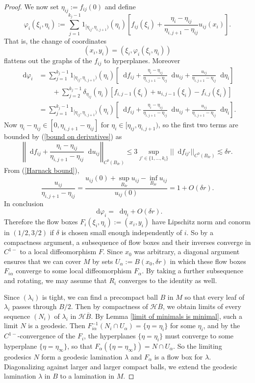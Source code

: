 \documentclass[reqno,11pt]{amsart}
\newcommand*\dif{\mathop{}\!\mathrm{d}}
\newcommand{\Hypspace}{\mathscr H}
\theoremstyle{definition}
\numberwithin{equation}{section}
\begin{document}
\begin{proof}
We now set $\eta_{ij} := f_{ij}(0)$ and define
$$\varphi_i(\xi_i, \eta_i) := \sum_{j=1}^{k_j - 1} 1_{[\eta_{ij}, \eta_{i,j+1})}(\eta_i) \left[f_{ij}(\xi_i) + \frac{\eta_i - \eta_{ij}}{\eta_{i,j+1} - \eta_{ij}} u_{ij}(x_i)\right].$$
That is, the change of coordinates
$$(x_i, y_i) = (\xi_i, \varphi_i(\xi_i, \eta_i))$$
flattens out the graphs of the $f_{ij}$ to hyperplanes.
Moreover
\begin{align*}
\dif \varphi_i &= \sum_{j=1}^{k_j - 1} 1_{[\eta_{ij}, \eta_{i, j + 1})}(\eta_i) \left[\dif f_{ij} + \frac{\eta_i - \eta_{ij}}{\eta_{i,j+1} - \eta_{ij}} \dif u_{ij} + \frac{u_{ij}}{\eta_{i,j+1} - \eta_{ij}} \dif \eta_i\right] \\
&\qquad + \sum_{j = 2}^{k_j - 1} \delta_{\eta_{ij}}(\eta_i)\left[f_{i,j-1}(\xi_i) + u_{i,j-1}(\xi_i) - f_{i,j}(\xi_i)\right] \\
&= \sum_{j=1}^{k_j - 1} 1_{[\eta_{ij}, \eta_{i, j + 1})}(\eta_i) \left[\dif f_{ij} + \frac{\eta_i - \eta_{ij}}{\eta_{i,j+1} - \eta_{ij}} \dif u_{ij} + \frac{u_{ij}}{\eta_{i,j+1} - \eta_{ij}} \dif \eta_i\right].
\end{align*}
Now $\eta_i - \eta_{ij} \in [0, \eta_{i, j + 1} - \eta_{ij}]$ for $\eta_i \in [\eta_{ij}, \eta_{i,j+1})$, so the first two terms are bounded by (\ref{bound on derivatives}) as
$$\left|\left|\dif f_{ij} + \frac{\eta_i - \eta_{ij}}{\eta_{i,j+1} - \eta_{ij}} \dif u_{ij}\right|\right|_{C^0(B_{\delta r})}
\leq 3\sup_{j' \in \{1, \dots, k_i\}} ||\dif f_{ij'}||_{C^0(B_{\delta r})}
\lesssim \delta r.$$
From (\ref{Harnack bound}),
$$\frac{u_{ij}}{\eta_{i,j+1} - \eta_{ij}} = \frac{u_{ij}(0) + \sup_{B_{\delta r}} u_{ij} - \inf_{B_{\delta r}} u_{ij}}{u_{ij}(0)} = 1 + O(\delta r).$$
In conclusion
$$\dif \varphi_i = \dif \eta_i + O(\delta r).$$
Therefore the flow boxes $F_i(\xi_i, \eta_i) := (x_i, y_i)$ have Lipschitz norm and conorm in $(1/2, 3/2)$ if $\delta$ is chosen small enough independently of $i$.
So by a compactness argument, a subsequence of flow boxes and their inverses converge in $C^{1-}$ to a local diffeomorphism $F$.
Since $x_0$ was arbitrary, a diagonal argument ensures that we can cover $M$ by sets $U_\alpha := B(x_0, \delta r)$ in which these flow boxes $F_{i\alpha}$ converge to some local diffeomorphism $F_\alpha$.
By taking a further subsequence and rotating, we may assume that $R_i$ converges to the identity as well.

Since $(\lambda_i)$ is tight, we can find a precompact ball $B$ in $M$ so that every leaf of $\lambda_i$ passes through $B/2$.
Then by compactness of $\Hypspace \overline B$, we obtain limits of every sequence $(N_i)$ of $\lambda_i$ in $\Hypspace \overline B$.
By Lemma \ref{limit of minimals is minimal}, such a limit $N$ is a geodesic.
Then $F_{i\alpha}^{-1}(N_i \cap U_\alpha) = \{\eta = \eta_i\}$ for some $\eta_i$, and by the $C^{1-}$-convergence of the $F_i$, the hyperplanes $\{\eta = \eta_i\}$ must converge to some hyperplane $\{\eta = \eta_\infty\}$, so that $F_\alpha(\{\eta = \eta_\infty\}) = N \cap U_\alpha$.
So the limiting geodesics $N$ form a geodesic lamination $\lambda$ and $F_\alpha$ is a flow box for $\lambda$.
Diagonalizing against larger and larger compact balls, we extend the geodesic lamination $\lambda$ in $B$ to a lamination in $M$.


\end{proof}
\end{document}
